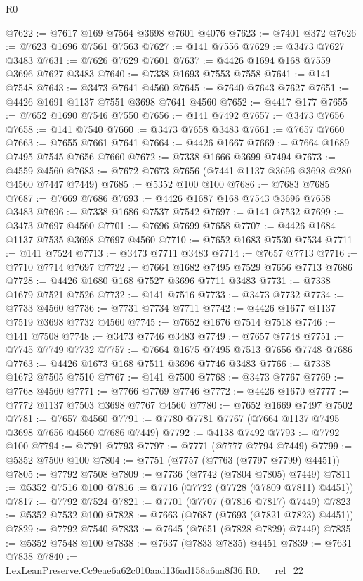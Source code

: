 \begin{lexlean}{R0}
\begin{coremodule}
@7622 := @7617 @169 @7564 @3698 @7601 @4076
@7623 := @7401 @372
@7626 := @7623 @1696 @7561 @7563
@7627 := @141 @7556
@7629 := @3473 @7627 @3483
@7631 := @7626 @7629 @7601
@7637 := @4426 @1694 @168 @7559 @3696 @7627 @3483
@7640 := @7338 @1693 @7553 @7558
@7641 := @141 @7548
@7643 := @3473 @7641 @4560
@7645 := @7640 @7643 @7627
@7651 := @4426 @1691 @1137 @7551 @3698 @7641 @4560
@7652 := @4417 @177
@7655 := @7652 @1690 @7546 @7550
@7656 := @141 @7492
@7657 := @3473 @7656
@7658 := @141 @7540
@7660 := @3473 @7658 @3483
@7661 := @7657 @7660
@7663 := @7655 @7661 @7641
@7664 := @4426 @1667
@7669 := @7664 @1689 @7495 @7545 @7656 @7660
@7672 := @7338 @1666 @3699 @7494
@7673 := @4559 @4560
@7683 := @7672 @7673 @7656 (@7441 @1137 @3696 @3698 @280 @4560 @7447 @7449)
@7685 := @5352 @100 @100
@7686 := @7683 @7685
@7687 := @7669 @7686
@7693 := @4426 @1687 @168 @7543 @3696 @7658 @3483
@7696 := @7338 @1686 @7537 @7542
@7697 := @141 @7532
@7699 := @3473 @7697 @4560
@7701 := @7696 @7699 @7658
@7707 := @4426 @1684 @1137 @7535 @3698 @7697 @4560
@7710 := @7652 @1683 @7530 @7534
@7711 := @141 @7524
@7713 := @3473 @7711 @3483
@7714 := @7657 @7713
@7716 := @7710 @7714 @7697
@7722 := @7664 @1682 @7495 @7529 @7656 @7713 @7686
@7728 := @4426 @1680 @168 @7527 @3696 @7711 @3483
@7731 := @7338 @1679 @7521 @7526
@7732 := @141 @7516
@7733 := @3473 @7732
@7734 := @7733 @4560
@7736 := @7731 @7734 @7711
@7742 := @4426 @1677 @1137 @7519 @3698 @7732 @4560
@7745 := @7652 @1676 @7514 @7518
@7746 := @141 @7508
@7748 := @3473 @7746 @3483
@7749 := @7657 @7748
@7751 := @7745 @7749 @7732
@7757 := @7664 @1675 @7495 @7513 @7656 @7748 @7686
@7763 := @4426 @1673 @168 @7511 @3696 @7746 @3483
@7766 := @7338 @1672 @7505 @7510
@7767 := @141 @7500
@7768 := @3473 @7767
@7769 := @7768 @4560
@7771 := @7766 @7769 @7746
@7772 := @4426 @1670
@7777 := @7772 @1137 @7503 @3698 @7767 @4560
@7780 := @7652 @1669 @7497 @7502
@7781 := @7657 @4560
@7791 := @7780 @7781 @7767 (@7664 @1137 @7495 @3698 @7656 @4560 @7686 @7449)
@7792 := @4138 @7492
@7793 := @7792 @100
@7794 := @7791 @7793
@7797 := @7771 (@7777 @7794 @7449)
@7799 := @5352 @7500 @100
@7804 := @7751 (@7757 (@7763 (@7797 @7799) @4451))
@7805 := @7792 @7508
@7809 := @7736 (@7742 (@7804 @7805) @7449)
@7811 := @5352 @7516 @100
@7816 := @7716 (@7722 (@7728 (@7809 @7811) @4451))
@7817 := @7792 @7524
@7821 := @7701 (@7707 (@7816 @7817) @7449)
@7823 := @5352 @7532 @100
@7828 := @7663 (@7687 (@7693 (@7821 @7823) @4451))
@7829 := @7792 @7540
@7833 := @7645 (@7651 (@7828 @7829) @7449)
@7835 := @5352 @7548 @100
@7838 := @7637 (@7833 @7835) @4451
@7839 := @7631 @7838
@7840 := LexLeanPreserve.Cc9eae6a62c010aad136ad158a6aa8f36.R0.__rel_22

\end{coremodule}
\end{lexlean}
